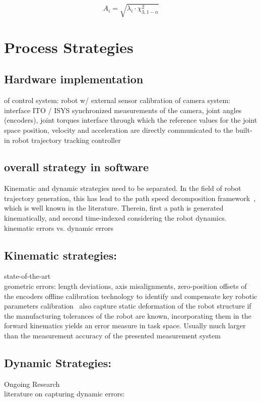\documentclass[5p,times,procedia]{elsarticle}
\begin{document}
\begin{equation}
	\label{eqn:LengthEllipsoid}
	A_{i}= \sqrt{\lambda_{i}\cdot \chi^{2}_{3,1-\alpha}}
\end{equation}


\cite{Luhmann2003}


\section{Process Strategies}
\subsection{Hardware implementation} of control system: robot w/ external sensor
calibration of camera system: interface ITO / ISYS
synchronized measurements of the camera, joint angles (encoders), joint torques 
interface through which the reference values for the joint space position, velocity and acceleration are directly communicated to the built-in robot trajectory tracking controller

\subsection{overall strategy in software}
Kinematic and dynamic strategies need to be separated. 
In the field of robot trajectory generation, this has lead to the path speed decomposition framework~\cite{Choset05}, which is well known in the literature. 
Therein, first a path is generated kinematically, and second time-indexed considering the robot dynamics. 
kinematic errors vs. dynamic errors 

\subsection{Kinematic strategies:} state-of-the-art\\
geometric errors: length deviations, axis misalignments, zero-position offsets of the encoders
offline calibration technology to identify and compensate key robotic parameters
calibration~\cite{Wiest01}
also capture static deformation of the robot structure
if the manufacturing tolerances of the robot are known, incorporating them in the forward kinematics yields an error measure in task space. Usually much larger than the measurement accuracy of the presented measurement system

\subsection{Dynamic Strategies:} Ongoing Research \\
literature on capturing dynamic errors:
\end{document}
